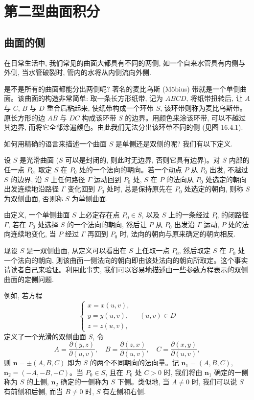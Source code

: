 \section{第二型曲面积分}
\label{sec:ma-16-4}

\subsection{曲面的侧}
\label{subsec:ma-16-4-1}

在日常生活中, 我们常见的曲面大都具有不同的两侧, 如一个自来水管具有内侧与外侧, 当水管破裂时, 管内的水将从内侧流向外侧.

是不是所有的曲面都能分出两侧呢? 著名的麦比乌斯 (Möbius) 带就是一个单侧曲面。该曲面的构造非常简单: 取一条长方形纸带, 记为 $ABCD$, 将纸带扭转后, 让 $A$ 与 $C$, $B$ 与 $D$ 重合后粘起来, 使纸带构成一个环带 $S$, 该环带则称为麦比乌斯带。原长方形的边 $AB$ 与 $DC$ 构成该环带 $S$ 的边界。用颜色来涂该环带, 可以不越过其边界, 而将它全部涂遍颜色。由此我们无法分出该环带不同的侧 (见图 16.4.1).

如何用精确的语言来描述一个曲面 $S$ 是单侧还是双侧的呢? 我们有以下定义.

\begin{definition}\label{definition:ma-16-4-1}
设 $S$ 是光滑曲面 ($S$ 可以是封闭的, 则此时无边界, 否则它具有边界)。对 $S$ 内部的任一点 $P_0$, 取定 $S$ 在 $P_0$ 处的一个法向的朝向。若一个动点 $P$ 从 $P_0$ 出发, 不越过 $S$ 的边界, 沿 $S$ 上任何路径 $\Gamma$ 运动回到 $P_0$ 处, $S$ 在 $P$ 的法向从 $P_0$ 处选定的朝向出发连续地沿路径 $\Gamma$ 变化回到 $P_0$ 处时, 总是保持原先在 $P_0$ 处选定的朝向, 则称 $S$ 为双侧曲面, 否则称 $S$ 为单侧曲面.
\end{definition}

由定义, 一个单侧曲面 $S$ 上必定存在点 $P_0\in S$, 以及 $S$ 上的一条经过 $P_0$ 的闭路径 $\Gamma$, 若在 $P_0$ 处选择 $S$ 的一个法向的朝向, 然后让 $P$ 从 $P_0$ 出发沿 $\Gamma$ 运动, $P$ 处的法向连续地变化, 当 $P$ 经过 $\Gamma$ 再回到 $P_0$ 时, 法向的朝向与原来确定的朝向相反.

现设 $S$ 是一双侧曲面, 从定义可以看出在 $S$ 上任取一点 $P_0$, 然后取定 $S$ 在 $P_0$ 处一个法向的朝向, 则该曲面一侧法向的朝向即由该处法向的朝向所取定。这个事实请读者自己来验证。利用此事实, 我们可以容易地描述由一些参数方程表示的双侧曲面的定侧问题.

例如, 若方程
\[
  \begin{cases}
    x=x(u,v),\\
    y=y(u,v),\\
    z=z(u,v),
  \end{cases}\quad (u,v)\in D
\]
定义了一个光滑的双侧曲面 $S$, 令
\begin{equation}
  A=\frac{\partial(y,z)}{\partial(u,v)},\quad
  B=\frac{\partial(z,x)}{\partial(u,v)},\quad
  C=\frac{\partial(x,y)}{\partial(u,v)},
  \label{eq:ma-16-4-1}
\end{equation}
则 $\boldsymbol n=\pm(A,B,C)$ 即为 $S$ 的两个不同朝向的法向量。记 $\boldsymbol n_1=(A,B,C)$, $\boldsymbol n_2=(-A,-B,-C)$。当 $P_0\in S$, 且在 $P_0$ 处 $C>0$ 时, 我们将由 $\boldsymbol n_1$ 确定的一侧称为 $S$ 的上侧, $\boldsymbol n_2$ 确定的一侧称为 $S$ 下侧。类似地, 当 $A\ne0$ 时, 我们可以说 $S$ 有前侧和后侧, 而当 $B\ne0$ 时, $S$ 有左侧和右侧.

